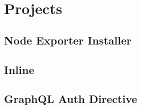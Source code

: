 \chapter{Projects}
\label{cha:projects}

\section{Node Exporter Installer}
\label{sec:projects_node_exporter_installer}

\section{Inline}
\label{sec:projects_inline}

\section{GraphQL Auth Directive}
\label{sec:projects_graphql_auth_diretive}
